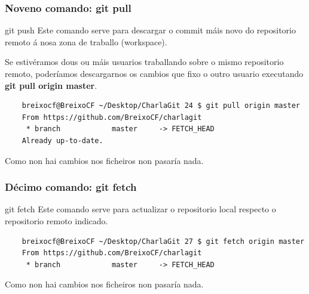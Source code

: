 \begin{frame}[fragile]
	\frametitle{Noveno comando: git pull}
	\begin{block}{git push}
		Este comando serve para descargar o commit máis novo do repositorio remoto á nosa zona de traballo (workspace).
	\end{block}
	\scriptsize
	Se estivéramos dous ou máis usuarios traballando sobre o mismo repositorio remoto, poderíamos descargarnos os cambios que fixo o outro usuario executando \textbf{git pull origin master}.
	\tiny 
	\begin{verbatim}
	breixocf@BreixoCF ~/Desktop/CharlaGit 24 $ git pull origin master 
	From https://github.com/BreixoCF/charlagit
	 * branch            master     -> FETCH_HEAD
	Already up-to-date.
	\end{verbatim}
	Como non hai cambios nos ficheiros non pasaría nada.
\end{frame}

\begin{frame}[fragile]
	\frametitle{Décimo comando: git fetch}
	\begin{block}{git fetch}
		Este comando serve para actualizar o repositorio local respecto o repositorio remoto indicado.
	\end{block}
	\scriptsize
	\begin{verbatim}
	breixocf@BreixoCF ~/Desktop/CharlaGit 27 $ git fetch origin master
	From https://github.com/BreixoCF/charlagit
	 * branch            master     -> FETCH_HEAD
	\end{verbatim}
	Como non hai cambios nos ficheiros non pasaría nada.
\end{frame}




